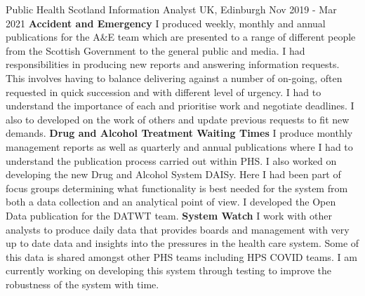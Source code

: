  \cventry
    {Public Health Scotland} %
    {Information Analyst} %
    {UK, Edinburgh} %
    {Nov 2019 - Mar 2021} %
    {
        \textbf{Accident and Emergency}\newline
        I produced weekly, monthly and annual publications for the A\&E team 
        which are presented to a range of different people from the Scottish 
        Government to the general public and media. I had responsibilities in 
        producing new reports and answering information requests. This involves 
        having to balance delivering against a number of on-going, often 
        requested in quick succession and with different level of urgency. I 
        had to understand the importance of each and prioritise work and 
        negotiate deadlines. I also to developed on the work of others and 
        update previous requests to fit new demands.\newline
        \textbf{Drug and Alcohol Treatment Waiting Times}\newline
        I produce monthly management reports as well as quarterly and annual 
        publications where I had to understand the publication process carried 
        out within PHS. I also worked on developing the new Drug and Alcohol 
        System DAISy. Here I had been part of focus groups determining what 
        functionality is best needed for the system from both a data collection 
        and an analytical point of view. I developed the Open Data publication 
        for the DATWT team.\newline
        \textbf{System Watch}\newline
        I work with other analysts to produce daily data that provides boards 
        and management with very up to date data and insights into the 
        pressures in the health care system. Some of this data is shared 
        amongst other PHS teams including HPS COVID teams. I am currently 
        working on developing this system through testing to improve the 
        robustness of the system with time.\newline
}
